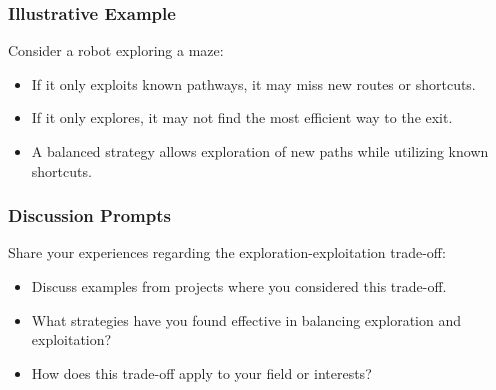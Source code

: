 \documentclass[aspectratio=169]{beamer}
\begin{document}
\begin{frame}[fragile]
    \frametitle{Illustrative Example}
    Consider a robot exploring a maze:
    \begin{itemize}
        \item If it only exploits known pathways, it may miss new routes or shortcuts.
        \item If it only explores, it may not find the most efficient way to the exit.
        \item A balanced strategy allows exploration of new paths while utilizing known shortcuts.
    \end{itemize}
\end{frame}

\begin{frame}[fragile]
    \frametitle{Discussion Prompts}
    Share your experiences regarding the exploration-exploitation trade-off:
    \begin{itemize}
        \item Discuss examples from projects where you considered this trade-off.
        \item What strategies have you found effective in balancing exploration and exploitation?
        \item How does this trade-off apply to your field or interests?
    \end{itemize}
\end{frame}
\end{document}
